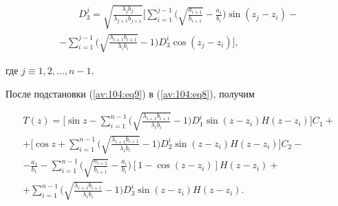 \begin{multline}

\label{av:104:eq12} \qquad\!\!\!

 D_3^j =\sqrt {\frac{\lambda _j b_j }{\lambda _{j+1} b_{j+1} }}

\biggl[

\sum\limits_{i=1}^{j-1}

\biggl( \sqrt {\frac{a_{i+1} }{b_{i+1} }}

-\frac{a_i }{b_i } \biggr)  \sin (z_j -z_i )- \\

 -\sum\limits_{i=1}^{j-1}

\biggl( \sqrt {\frac{\lambda _{i+1} b_{i+1}

}{\lambda _i b_i }} -1 \biggr) D_3^i \cos (z_j -z_i )

\biggr],

 \end{multline}

где $j\equiv 1, 2, \dots, n-1$.



После подстановки (\ref{av:104:eq9}) в (\ref{av:104:eq8}), получим

\begin{multline}

 T(z)=\biggl[ \sin z-

\sum\limits_{i=1}^{n-1}  \biggl(

\sqrt {\frac{\lambda _{i+1} b_{i+1} }{\lambda _i b_i }} -1\biggr)

D_1^i \sin (z-z_i )H(z-z_i ) \biggr] C_1 +

\\

 +\biggl[ \cos z+

\sum\limits_{i=1}^{n-1}

 \biggl( \sqrt

{\frac{\lambda _{i+1} b_{i+1} }{\lambda _i b_i }} -1 \biggr)

D_2^i \sin (z-z_i )H(z-z_i ) \biggr] C_2 -

\\

\label{av:104:eq13}

 -\frac{a_1 }{b_1 } -

\sum\limits_{i=1}^{n-1} \biggl( \sqrt {\frac{a_{i+1} }{b_{i+1} }} -\frac{a_i }{b_i } \biggr)

\left[ 1-\cos (z-z_i ) \right] H(z-z_i )+ \\

 +\sum\limits_{i=1}^{n-1}

\biggl( \sqrt {\frac{\lambda _{i+1} b_{i+1} }{\lambda _i b_i }} -1 \biggr) D_3^i \sin (z-z_i ) H(z-z_i ).

 \end{multline}




